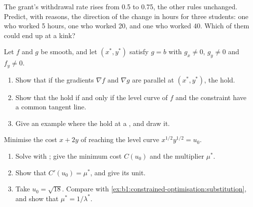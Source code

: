 \begin{exercise}[$\star\star$]\label{exo:b1:constrained-optimisation:withdrawal}
The grant's withdrawal rate rises from 0.5 to 0.75, the other rules
unchanged. Predict, with reasons, the direction of the change in hours for
three students: one who worked 5 hours, one who worked 20, and one who
worked 40. Which of them could end up at a kink?
\end{exercise}

\begin{exercise}[$\star\star\star$]\label{exo:b1:constrained-optimisation:equivalence}
Let $f$ and $g$ be smooth, and let $(x^*, y^*)$ satisfy $g = b$ with
$g_x \neq 0$, $g_y \neq 0$ and $f_y \neq 0$.
\begin{enumerate}
  \item Show that if the gradients $\nabla f$ and $\nabla g$ are parallel at $(x^*, y^*)$, the  hold.
  \item Show that the  hold if and only if the level curve of $f$ and the constraint have a common tangent line.
  \item Give an example where the  hold at a , and draw it.
\end{enumerate}
\end{exercise}

\begin{exercise}[$\star\star\star$]\label{exo:b1:constrained-optimisation:dual}
Minimise the cost $x + 2y$ of reaching the level curve $x^{1/2}y^{1/2} = u_0$.
\begin{enumerate}
  \item Solve with ; give the minimum cost $C(u_0)$ and the multiplier $\mu^*$.
  \item Show that $C'(u_0) = \mu^*$, and give its unit.
  \item Take $u_0 = \sqrt{18}$. Compare with \cref{ex:b1:constrained-optimisation:substitution}, and show that $\mu^* = 1/\lambda^*$.
\end{enumerate}
\end{exercise}

